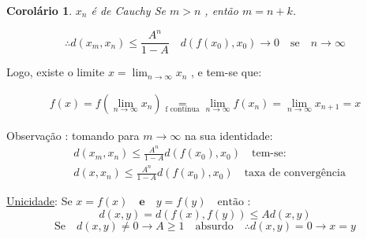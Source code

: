 \documentclass{article}
\newtheorem*{corollary}{Corolário}
\begin{document}
\pagebreak

\begin{corollary}
    ${x_n}$ é de Cauchy
    Se  $m > n$ , então $m = n + k$.
\end{corollary}


\begin{equation*}
\therefore d({x_m},{x_n}) \leq \frac{A^n}{1-A} \quad d({f(x_0)}, {x_0}) \rightarrow 0 \quad \text{se} \quad n \rightarrow \infty
\end{equation*}

Logo, existe o limite $ x = \lim_{n \to \infty}{x_n}$ ,  e tem-se que:

\begin{gather*}
f(x) = f(\lim_{n \to \infty}{x_n}) \underset{\text{f contínua}}{=} \lim_{n \to \infty}{f({x_n})} = \lim_{n \to \infty}{x_{n+1}} = x
\end{gather*}

Observação : tomando para $m \rightarrow \infty $ na sua identidade:
\begin{align*}
&d({x_m},{x_n}) \leq \frac{A^n}{1-A} d({f(x_0)}, {x_0}) \quad \text{tem-se:} \\
&d({x},{x_n}) \leq \frac{A^n}{1-A} d({f(x_0)}, {x_0}) \quad \text{taxa de convergência}
\end{align*}

\underline{Unicidade}: Se $x = f(x) \quad \textbf{e} \quad y = f(y)  \quad  \text{então :}$
\[
d(x,y) = d(f(x),f(y)) \leq  A d(x,y)
\]
\[
\text{Se}\quad d(x,y) \neq 0 \rightarrow A \geq 1 \quad \text{absurdo} \quad \therefore d(x,y) = 0 \rightarrow x = y
\]
\end{document}
